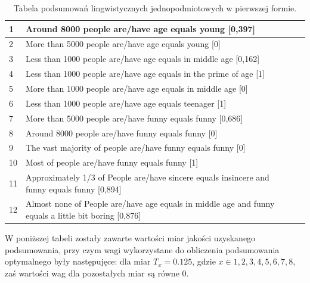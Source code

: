 \documentclass{classrep}
\begin{document}
\begin{center}
\begin{table}[H]
\begin{tabularx}{\textwidth}{lXc}
    1 & Around 8000 people are/have age equals young [0,397] \\ \hline
    2 & More than 5000 people are/have age equals young [0]  \\ \hline
    3 & Less than 1000 people are/have age equals in middle age [0,162] \\ \hline
    4 & Less than 1000 people are/have age equals in the prime of age [1] \\ \hline
    5 & More than 1000 people are/have age equals in middle age [0] \\ \hline
    6 & Less than 1000 people are/have age equals teenager [1] \\ \hline
    7 & More than 5000 people are/have funny equals funny [0,686]  \\ \hline
    8 & Around 8000 people are/have funny equals funny [0] \\ \hline
    9 & The vast majority of people are/have funny equals funny [0] \\ \hline 
    10 & Most of people are/have funny equals funny [1] \\ \hline
    11 & Approximately 1/3 of People are/have sincere equals insincere and funny equals funny [0,894] \\ \hline
    12 & Almost none of People are/have age equals in middle age and funny equals a little bit boring [0,876] \\ \hline

  \end{tabularx}
  \caption{Tabela podsumowań lingwistycznych jednopodmiotowych w pierwszej formie.}
\end{table}
\end{center}


W poniższej tabeli zostały zawarte wartości miar jakości uzyskanego podsumowania, przy czym wagi wykorzystane do
obliczenia podsumowania optymalnego były następujęce: dla miar $T_{x} = 0.125$, gdzie $x \in {1,2,3,4,5,6,7,8}$, zaś wartości wag dla pozostałych miar są równe 0.
\end{document}
